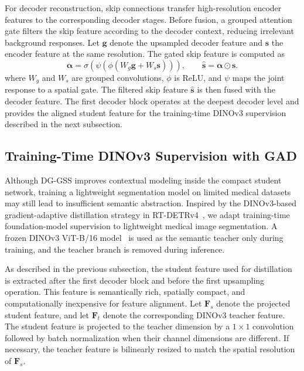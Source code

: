 For decoder reconstruction, skip connections transfer high-resolution encoder features to the corresponding decoder stages. Before fusion, a grouped attention gate filters the skip feature according to the decoder context, reducing irrelevant background responses. Let $\mathbf{g}$ denote the upsampled decoder feature and $\mathbf{s}$ the encoder feature at the same resolution. The gated skip feature is computed as
\begin{equation}
\boldsymbol{\alpha}
=
\sigma\left(
\psi\left(
\phi(W_g\mathbf{g}+W_s\mathbf{s})
\right)
\right),
\qquad 
\hat{\mathbf{s}}=\boldsymbol{\alpha}\odot\mathbf{s}.
\end{equation}
where $W_g$ and $W_s$ are grouped convolutions, $\phi$ is ReLU, and $\psi$ maps the joint response to a spatial gate. The filtered skip feature $\hat{\mathbf{s}}$ is then fused with the decoder feature. The first decoder block operates at the deepest decoder level and provides the aligned student feature for the training-time DINOv3 supervision described in the next subsection.





\subsection{Training-Time DINOv3 Supervision with GAD}

Although DG-GSS improves contextual modeling inside the compact student network, training a lightweight segmentation model on limited medical datasets may still lead to insufficient semantic abstraction. Inspired by the DINOv3-based gradient-adaptive distillation strategy in RT-DETRv4~\cite{liao2025rtdetrv4}, we adapt training-time foundation-model supervision to lightweight medical image segmentation. A frozen DINOv3 ViT-B/16 model~\cite{simeoni2025dinov3} is used as the semantic teacher only during training, and the teacher branch is removed during inference.

As described in the previous subsection, the student feature used for distillation is extracted after the first decoder block and before the first upsampling operation. This feature is semantically rich, spatially compact, and computationally inexpensive for feature alignment. Let $\mathbf{F}_{s}$ denote the projected student feature, and let $\mathbf{F}_{t}$ denote the corresponding DINOv3 teacher feature. The student feature is projected to the teacher dimension by a $1\times1$ convolution followed by batch normalization when their channel dimensions are different. If necessary, the teacher feature is bilinearly resized to match the spatial resolution of $\mathbf{F}_{s}$.

